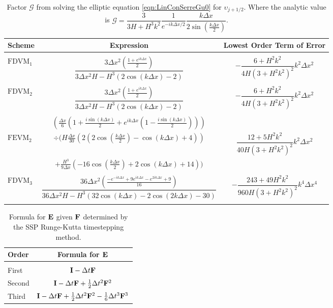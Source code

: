 \begin{table}
	\centering   
	\begin{tabular}{l  c  c}
		Scheme& Expression& Lowest Order Term of Error\\
		\hline && \\
		$\text{FDVM}_1$& $\dfrac{3 \Delta x^2 \left(\frac{1 + e^{ik\Delta x}}{2}\right)}{3 \Delta x^2 H - H^3 \left(2\cos\left(k\Delta x\right) - 2\right)}$ & $-\dfrac{6 +H^2k^2}{4H \left(3 + H^2k^2\right)^2}k^2 \Delta x^2$ \\ & & \\
		$\text{FDVM}_2$& $\dfrac{3 \Delta x^2 \left(\frac{1 + e^{ik\Delta x}}{2}\right)}{3 \Delta x^2 H - H^3 \left(2\cos\left(k\Delta x\right) - 2\right)}$ & $-\dfrac{6 +H^2k^2}{4H \left(3 + H^2k^2\right)^2}k^2 \Delta x^2$ \\ & & \\
		& $\left(\frac{\Delta x}{6} \left(1 + \frac{i \sin\left(k \Delta x\right)}{2} + e^{ik\Delta x}\left(1 - \frac{i \sin\left(k \Delta x\right)}{2}\right) \right)\right)$ & \\  $\text{FEVM}_2$ & $\div  \Bigg(H\frac{\Delta x}{30} \left( 2\left(2\cos\left(\frac{k \Delta x}{2}\right) - \cos\left({k \Delta x}\right) + 4\right)  \right)$  & $\dfrac{12 + 5H^2k^2}{40H \left(3 + H^2k^2\right)^2}k^2 \Delta x^2$ \\ &$+ \frac{H^3 }{9\Delta x}\left(-16\cos\left(\frac{k\Delta x}{2}\right) + 2 \cos\left(k \Delta x\right) + 14\right)    \Bigg)$ & \\ & & \\
		$\text{FDVM}_3$&  $\dfrac{36 \Delta x^2 \left(\frac{-e^{-ik\Delta x} + 9e^{ik\Delta x} - e^{2ik\Delta x} + 9}{16}\right)}{36 \Delta x^2H - H^3\left(32\cos\left(k \Delta x\right) -2\cos\left(2k \Delta x\right) - 30\right)}$ & $-\dfrac{243 + 49H^2k^2}{960H\left(3 + H^2k^2\right)^2}k^4 \Delta x^4$ \\ & & \\ 
	\end{tabular}
	\caption{Factor $\mathcal{G}$ from solving the elliptic equation \eqref{eqn:LinConSerreGu0} for $\upsilon_{j+1/2}$. Where the analytic value is  $\mathcal{G} = \dfrac{3}{3H + H^3k^2} \dfrac{1}{e^{-ik\Delta x/2}} \dfrac{k\Delta x}{2 \sin\left(\frac{k \Delta x}{2}\right)}$.}
	\label{tab:Gfactor} 
\end{table}


\begin{table}
	\centering
	\begin{tabular}{l  c}
		Order& Formula for $\mathbf{E}$\\
		\hline &\\
		First& $\mathbf{I} - \Delta t\mathbf{F} $ \\
		Second& $ \mathbf{I}  -\Delta t\mathbf{F} + \frac{1}{2}\Delta t^2\mathbf{F}^2$ \\
		Third& $\mathbf{I} -\Delta t\mathbf{F} + \frac{1}{2}\Delta t^2 \mathbf{F}^2 - \frac{1}{6}\Delta t^3 \mathbf{F}^3 $ \\
	\end{tabular}
	\caption{Formula for $\mathbf{E}$ given $\mathbf{F}$ determined by the SSP Runge-Kutta timestepping method.}
	\label{tab:RKstepfactor}
\end{table}


